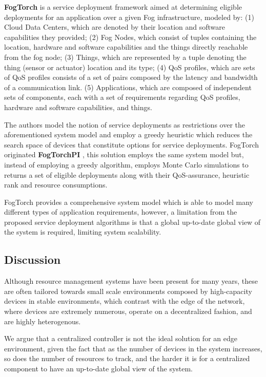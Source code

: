 \textbf{FogTorch} \cite{Brogi2017} is a service deployment framework aimed at determining eligible deployments for an application over a given Fog infrastructure, modeled by: (1) Cloud Data Centers, which are denoted by their location and software capabilities they provided; (2) Fog Nodes, which consist of tuples containing the location, hardware and software capabilities and the things directly reachable from the fog node; (3) Things, which are represented by a tuple denoting the thing (sensor or actuator) location and its type; (4) QoS profiles, which are sets of QoS profiles consists of a set of pairs composed by the latency and bandwidth of a communication link. (5) Applications, which are composed of independent sets of components, each with a set of requirements regarding QoS profiles, hardware and software capabilities, and things.

The authors model the notion of service deployments as restrictions over the aforementioned system model and employ a greedy heuristic which reduces the search space of devices that constitute options for service deployments. FogTorch originated \textbf{FogTorchPI} \cite{brogi2017best}, this solution employs the same system model but, instead of employing a greedy algorithm, employs Monte Carlo simulations to returns a set of eligible deployments along with their QoS-assurance, heuristic rank and resource consumptions. 

FogTorch provides a comprehensive system model which is able to model many different types of application requirements, however, a limitation from the proposed service deployment algorithms is that a global up-to-date global view of the system is required, limiting system scalability.

\subsection{Discussion}

Although resource management systems have been present for many years, these are often tailored towards small scale environments composed by high-capacity devices in stable environments, which contrast with the edge of the network, where devices are extremely numerous, operate on a decentralized fashion, and are highly heterogenous.

We argue that a centralized controller is not the ideal solution for an edge environment, given the fact that as the number of devices in the system increases, so does the number of resources to track, and the harder it is for a centralized component to have an up-to-date global view of the system. 

